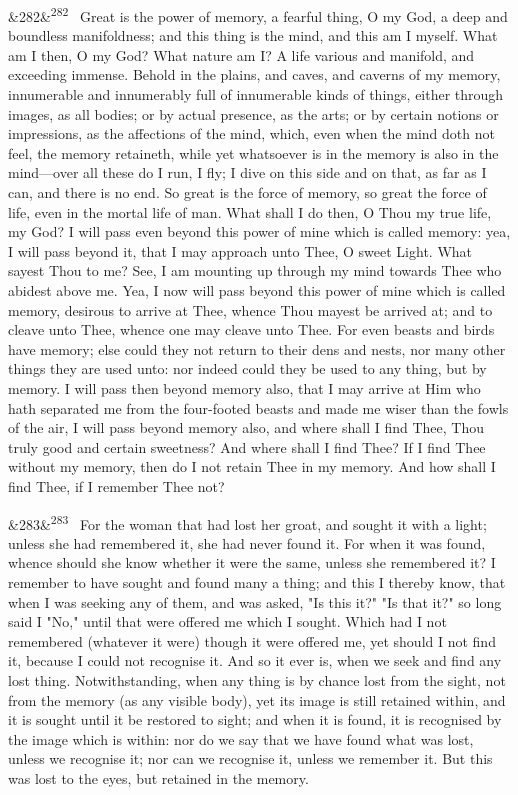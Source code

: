\documentclass[12pt]{article}
\newcommand{\para}[1][]{\par\noindent\ifx&#1&\else\textsuperscript{\footnotesize #1}~\fi}
\begin{document}
\para[282] Great is the power of memory, a fearful thing, O my God, a deep and boundless manifoldness; and this thing is the mind, and this am I myself. What am I then, O my God? What nature am I? A life various and manifold, and exceeding immense. Behold in the plains, and caves, and caverns of my memory, innumerable and innumerably full of innumerable kinds of things, either through images, as all bodies; or by actual presence, as the arts; or by certain notions or impressions, as the affections of the mind, which, even when the mind doth not feel, the memory retaineth, while yet whatsoever is in the memory is also in the mind---over all these do I run, I fly; I dive on this side and on that, as far as I can, and there is no end. So great is the force of memory, so great the force of life, even in the mortal life of man. What shall I do then, O Thou my true life, my God? I will pass even beyond this power of mine which is called memory: yea, I will pass beyond it, that I may approach unto Thee, O sweet Light. What sayest Thou to me? See, I am mounting up through my mind towards Thee who abidest above me. Yea, I now will pass beyond this power of mine which is called memory, desirous to arrive at Thee, whence Thou mayest be arrived at; and to cleave unto Thee, whence one may cleave unto Thee. For even beasts and birds have memory; else could they not return to their dens and nests, nor many other things they are used unto: nor indeed could they be used to any thing, but by memory. I will pass then beyond memory also, that I may arrive at Him who hath separated me from the four-footed beasts and made me wiser than the fowls of the air, I will pass beyond memory also, and where shall I find Thee, Thou truly good and certain sweetness? And where shall I find Thee? If I find Thee without my memory, then do I not retain Thee in my memory. And how shall I find Thee, if I remember Thee not?

\para[283] For the woman that had lost her groat, and sought it with a light; unless she had remembered it, she had never found it. For when it was found, whence should she know whether it were the same, unless she remembered it? I remember to have sought and found many a thing; and this I thereby know, that when I was seeking any of them, and was asked, "Is this it?" "Is that it?" so long said I "No," until that were offered me which I sought. Which had I not remembered (whatever it were) though it were offered me, yet should I not find it, because I could not recognise it. And so it ever is, when we seek and find any lost thing. Notwithstanding, when any thing is by chance lost from the sight, not from the memory (as any visible body), yet its image is still retained within, and it is sought until it be restored to sight; and when it is found, it is recognised by the image which is within: nor do we say that we have found what was lost, unless we recognise it; nor can we recognise it, unless we remember it. But this was lost to the eyes, but retained in the memory.
\end{document}
